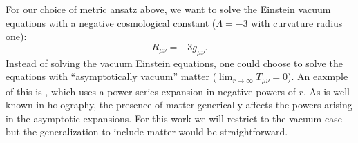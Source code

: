 \documentclass[a4paper,11pt]{article}
\numberwithin{equation}{section}
\begin{document}
For our choice of metric ansatz above, we want to solve the Einstein vacuum equations with a negative cosmological constant ($\Lambda=-3$ with curvature radius one):
\begin{equation} \label{eq:2.1}
R_{\mu \nu}=-3 g_{\mu \nu}. 
\end{equation}
Instead of solving the vacuum Einstein equations, one could choose to solve the equations with ``asymptotically vacuum'' matter ($\lim_{r \rightarrow \infty} T_{\mu \nu} =0$). An eaxmple of this is \cite{Flanagan:2015pxa}, which uses a power series expansion in negative powers of $r$. As is well known in holography, the presence of matter generically affects the powers arising in the asymptotic expansions. For this work we will restrict to the vacuum case but the generalization to include matter would be straightforward. 

\end{document}
